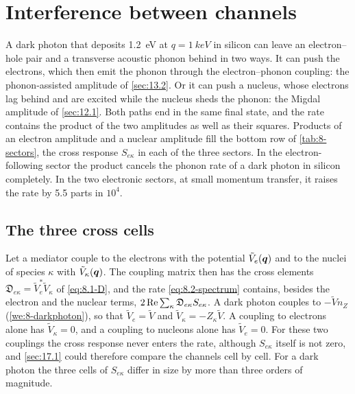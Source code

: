 \section{Interference between channels}\label{sec:17.4}

A dark photon that deposits \SI{1.2}{eV} at $q = \SI{1}{keV}$ in silicon can leave an electron--hole pair and a transverse acoustic phonon behind in two ways. It can push the electrons, which then emit the phonon through the electron--phonon coupling: the phonon-assisted amplitude of \cref{sec:13.2}. Or it can push a nucleus, whose electrons lag behind and are excited while the nucleus sheds the phonon: the Migdal amplitude of \cref{sec:12.1}. Both paths end in the same final state, and the rate contains the product of the two amplitudes as well as their squares. Products of an electron amplitude and a nuclear amplitude fill the bottom row of \cref{tab:8-sectors}, the cross response $S_{e\kappa}$ in each of the three sectors. In the electron-following sector the product cancels the phonon rate of a dark photon in silicon completely. In the two electronic sectors, at small momentum transfer, it raises the rate by 5.5 parts in $10^4$.

\subsection{The three cross cells}\label{sec:17.4-cells}

Let a mediator couple to the electrons with the potential $\tilde V_e(\bm{q})$ and to the nuclei of species $\kappa$ with $\tilde V_\kappa(\bm{q})$. The coupling matrix then has the cross elements $\mathfrak{D}_{e\kappa} = \tilde V_e^*\tilde V_\kappa$ of \cref{eq:8.1-D}, and the rate \cref{eq:8.2-spectrum} contains, besides the electron and the nuclear terms, $2\operatorname{Re}\sum_\kappa\mathfrak{D}_{e\kappa}S_{e\kappa}$. A dark photon couples to $-\tilde Vn_Z$ (\cref{we:8-darkphoton}), so that $\tilde V_e = \tilde V$ and $\tilde V_\kappa = -Z_\kappa\tilde V$. A coupling to electrons alone has $\tilde V_\kappa = 0$, and a coupling to nucleons alone has $\tilde V_e = 0$. For these two couplings the cross response never enters the rate, although $S_{e\kappa}$ itself is not zero, and \cref{sec:17.1} could therefore compare the channels cell by cell. For a dark photon the three cells of $S_{e\kappa}$ differ in size by more than three orders of magnitude.

